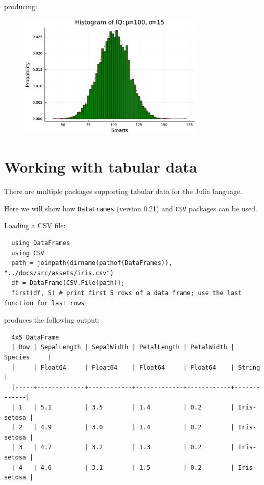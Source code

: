 \documentclass[10pt,a4paper]{article}
\begin{document}
producing:
\begin{figure}[h]
\centering
\includegraphics[width=9cm]{hist.pdf}
\end{figure}

\section{Working with tabular data}

There are multiple packages supporting tabular data for the Julia language.

Here we will show how \lstinline|DataFrames| (version 0.21)
and \lstinline|CSV| packages can be used.

Loading a CSV file:
\begin{lstlisting}
  using DataFrames
  using CSV
  path = joinpath(dirname(pathof(DataFrames)), "../docs/src/assets/iris.csv")
  df = DataFrame(CSV.File(path));
  first(df, 5) # print first 5 rows of a data frame; use the last function for last rows
\end{lstlisting}

produces the following output:
\begin{lstlisting}
  4x5 DataFrame
  | Row | SepalLength | SepalWidth | PetalLength | PetalWidth | Species     |
  |     | Float64     | Float64    | Float64     | Float64    | String      |
  |-----+-------------+------------+-------------+------------+-------------|
  | 1   | 5.1         | 3.5        | 1.4         | 0.2        | Iris-setosa |
  | 2   | 4.9         | 3.0        | 1.4         | 0.2        | Iris-setosa |
  | 3   | 4.7         | 3.2        | 1.3         | 0.2        | Iris-setosa |
  | 4   | 4.6         | 3.1        | 1.5         | 0.2        | Iris-setosa |
\end{lstlisting}
\end{document}
